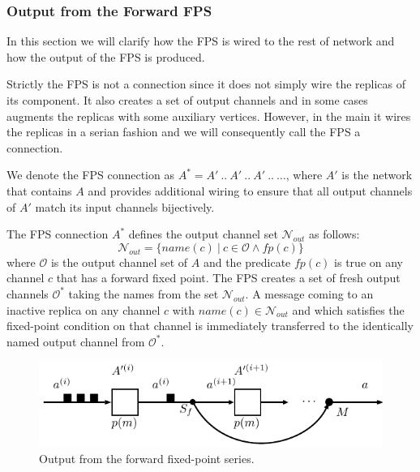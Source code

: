 

    \subsubsection{Output from the Forward FPS}
In this section we will clarify how the FPS is wired to the rest of network and how the output of the FPS is produced.

Strictly the FPS is not a connection since it does not simply wire the replicas of its component. It also creates a set of output channels and in some cases augments the replicas with some auxiliary vertices. However, in the main it wires the replicas in a serian fashion and we will consequently call the FPS a connection.

We denote the FPS connection as $A^{*} = A' \: .. \: A' \: .. \: A' \: .. \: \dots$, where $A'$ is the network that contains $A$ and provides additional wiring to ensure that all output channels of $A'$ match its input channels bijectively.

The FPS connection $A^{*}$ defines the output channel set $\mathcal{N}_{out}$ as follows:
\begin{equation}
\mathcal{N}_{out} = \{ name(c) \: | \: c \in \mathcal{O} \land fp(c) \}\nonumber
\end{equation}
where $\mathcal{O}$ is the output channel set of $A$ and the predicate $fp(c)$ is true on any channel $c$ that has a forward fixed point. The FPS creates a set of fresh output channels $\mathcal{O}^{*}$ taking the names from the set $\mathcal{N}_{out}$. A message coming to an inactive replica on any channel $c$ with $name(c) \in \mathcal{N}_{out}$ and which satisfies the fixed-point condition on that channel is immediately transferred to the identically named output channel from $\mathcal{O}^{*}$.

  \begin{figure}[h!]
  \centering
  \includegraphics{figs/chapter_04_ffp_out.pdf}
  \caption{Output from the forward fixed-point series.}
  \label{fig:ffp_out}
  \end{figure}

